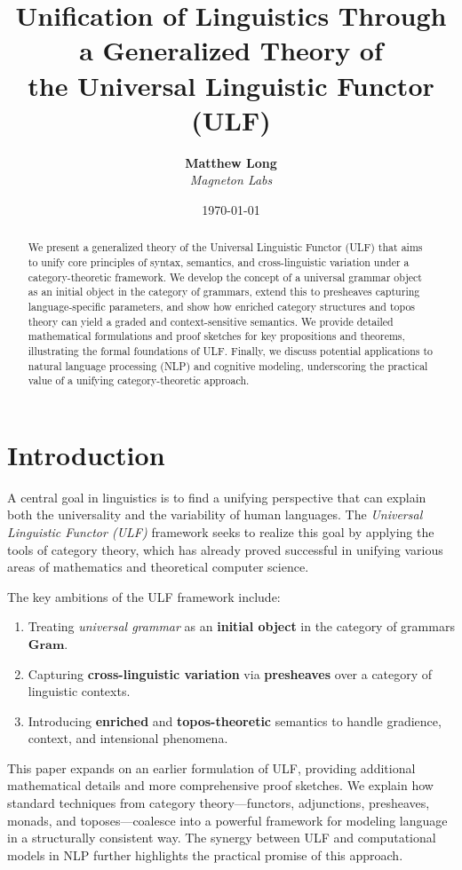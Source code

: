 \documentclass[12pt]{article}
\title{\textbf{Unification of Linguistics Through a Generalized Theory of\\
the Universal Linguistic Functor (ULF)}}
\author{
  \textbf{Matthew Long}\\
  \textit{Magneton Labs}
}
\date{\today}
\theoremstyle{plain}
\theoremstyle{definition}
\begin{document}
\maketitle

\begin{abstract}
We present a generalized theory of the Universal Linguistic Functor (ULF) that aims to unify core principles of syntax, semantics, and cross-linguistic variation under a category-theoretic framework. We develop the concept of a universal grammar object as an initial object in the category of grammars, extend this to presheaves capturing language-specific parameters, and show how enriched category structures and topos theory can yield a graded and context-sensitive semantics. We provide detailed mathematical formulations and proof sketches for key propositions and theorems, illustrating the formal foundations of ULF. Finally, we discuss potential applications to natural language processing (NLP) and cognitive modeling, underscoring the practical value of a unifying category-theoretic approach.
\end{abstract}

\tableofcontents

\section{Introduction}\label{sec:intro}
A central goal in linguistics is to find a unifying perspective that can explain both the universality and the variability of human languages. The \emph{Universal Linguistic Functor (ULF)} framework seeks to realize this goal by applying the tools of category theory, which has already proved successful in unifying various areas of mathematics and theoretical computer science.

The key ambitions of the ULF framework include:
\begin{enumerate}
    \item Treating \emph{universal grammar} as an \textbf{initial object} in the category of grammars \(\mathbf{Gram}\).
    \item Capturing \textbf{cross-linguistic variation} via \textbf{presheaves} over a category of linguistic contexts.
    \item Introducing \textbf{enriched} and \textbf{topos-theoretic} semantics to handle gradience, context, and intensional phenomena.
\end{enumerate}

This paper expands on an earlier formulation of ULF, providing additional mathematical details and more comprehensive proof sketches. We explain how standard techniques from category theory---functors, adjunctions, presheaves, monads, and toposes---coalesce into a powerful framework for modeling language in a structurally consistent way. The synergy between ULF and computational models in NLP further highlights the practical promise of this approach.
\end{document}
